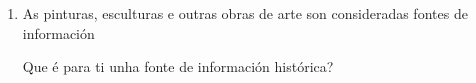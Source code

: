\begin{multicols}{2}
\begin{ejercicio}
\begin{enumerate}[1)]
  \begin{enumerate}[1.]
   \item \dotfill 
   \item \dotfill 
   \item \dotfill 
   \item \dotfill 
  \end{enumerate}
 
 \item
 As pinturas, esculturas e outras obras de arte son consideradas fontes de información \par
 \dotfill
 \par
 Que é para ti unha fonte de información histórica?
 \par \vspace*{2.3cm}
 \end{enumerate}
\end{ejercicio}
%
\end{multicols}



